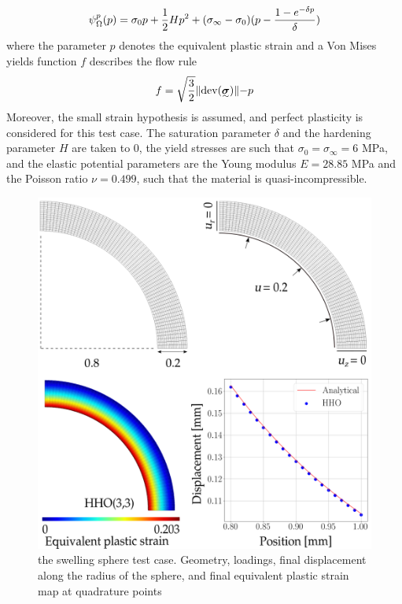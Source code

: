 \begin{equation}
    \psi{}_{\Omega{}}^p(p)
    =
    \sigma_0 p + \frac{1}{2} H p^2 + (\sigma_{\infty} - \sigma_0)(p - \frac{1 - e^{-\delta p}}{\delta})
\end{equation}
%
%
%
where the parameter $p$ denotes the equivalent plastic strain and a Von Mises yields function $f$ describes the flow rule
%
%
%
\begin{equation}
    f = \sqrt{\frac{3}{2}} \rVert \text{dev} (\tensorii{\sigma}) \lVert - p
\end{equation}
%
%
%
Moreover, the small strain hypothesis is assumed, and
perfect plasticity is considered for this test case. The saturation parameter $\delta$ and the hardening parameter $H$ are taken to $0$, the yield stresses are such that $\sigma_0 = \sigma_{\infty} = 6$ MPa, and the elastic potential parameters are the Young modulus $E = 28.85$ MPa and the Poisson ratio $\nu = 0.499$, such that the material is quasi-incompressible.

\begin{figure}[H]
    \centering
    \includegraphics[width=12.cm]{../chapter_01_hho_mechanics/figures/sphere_mesh.png}
    \caption{the swelling sphere test case. Geometry, loadings, final displacement along the radius of the sphere, and final equivalent plastic strain map at quadrature points}
    \label{fig_sphereall}
\end{figure}


